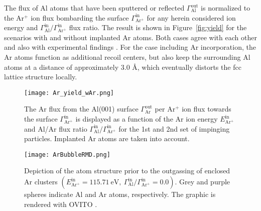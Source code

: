 \documentclass[12pt,a4paper,preprint,superscriptaddress]{revtex4-1}
\begin{document}
The flux of Al atoms that have been sputtered or reflected $\Gamma_\mathrm{Al}^\mathrm{out}$ is normalized to the Ar$^+$ ion flux bombarding the surface $\Gamma_\mathrm{Ar^+}^\mathrm{in}$ for any herein considered ion energy and $\Gamma_\mathrm{Al}^\mathrm{in}/\Gamma_\mathrm{Ar^+}^\mathrm{in}$ flux ratio. The result is shown in Figure~\ref{fig:yield} for the scenarios with and without implanted Ar atoms. Both cases agree with each other and also with experimental findings \citep{laegreid1961sputtering}. For the case including Ar incorporation, the Ar atoms function as additional recoil centers, but also keep the surrounding Al atoms at a distance of approximately 3.0 \r A, which eventually distorts the fcc lattice structure locally.

\begin{figure}[t]
\texttt{[image: Ar\_yield\_wAr.png]}
\caption{The Ar flux from the Al(001) surface $\Gamma_\mathrm{Ar}^\mathrm{out}$ per Ar$^+$ ion flux towards the surface $\Gamma_\mathrm{Ar^+}^\mathrm{in}$ is displayed as a function of the Ar ion energy $E_\mathrm{Ar^+}^\mathrm{in}$ and Al/Ar flux ratio $\Gamma_\mathrm{Al}^\mathrm{in}/\Gamma_\mathrm{Ar^+}^\mathrm{in}$ for the 1st and 2nd set of impinging particles. Implanted Ar atoms are taken into account.}
\label{fig:Ar_yield}
\end{figure}

\begin{figure}[t]
\texttt{[image: ArBubbleRMD.png]}
\caption{Depiction of the atom structure prior to the outgassing of enclosed Ar clusters $\left(E_\mathrm{Ar^+}^\mathrm{in}=115.71~\mathrm{eV},~\Gamma_\mathrm{Al}^\mathrm{in}/\Gamma_\mathrm{Ar^+}^\mathrm{in}=0.0\right)$. Grey and purple spheres indicate Al and Ar atoms, respectively. The graphic is rendered with OVITO \citep{stukowski2009visualization}.}
\label{fig:ArBubbleRMD}
\end{figure}
\end{document}
